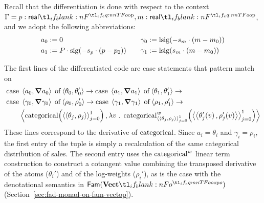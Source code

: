 \documentclass[11pt,a4paper]{article}
\theoremstyle{definition}
\theoremstyle{remark}
\providecommand{\Fam}[1]{\mathsf{Fam}(#1)}
\begin{document}
Recall that the differentiation is done with respect to the context \( \Gamma = p : \srcreal, m : \srcreal \), and we adopt the following abbreviations:
\begin{equation*}
  \begin{aligned}
    a_{0} &:= 0
    \\
    a_{1} &:= P \cdot \fn[n]{ \opn[b]{sig} }{ -s_{p} \cdot \left( p - p_{0} \right) }
  \end{aligned}
  \qquad
  \begin{aligned}
    \gamma_{0} &:= \fn[n]{ \opn[b]{lsig} }{ -s_{m} \cdot \left( m - m_{0} \right) }
    \\
    \gamma_{1} &:= \fn[n]{ \opn[b]{lsig} }{ s_{m} \cdot \left( m - m_{0} \right) }
  \end{aligned}
\end{equation*}

The first lines of the differentiated code are case statements that pattern match on
\begin{equation*}
  \begin{aligned}
    &\opn[b]{case} \; \tuple{ a_{0}, \grad a_{0} } \; \opn[b]{of}
      \tuple{ \theta_{0}, \theta_{0}' } \to
    \opn[b]{case} \; \tuple{ a_{1}, \grad a_{1} } \; \opn[b]{of}
      \tuple{ \theta_{1}, \theta_{1}' } \to
    \\
    &\opn[b]{case} \; \tuple{ \gamma_{0}, \grad \gamma_{0} } \; \opn[b]{of}
      \tuple{ \rho_{0}, \rho_{0}' } \to
    \opn[b]{case} \; \tuple{ \gamma_{1}, \grad \gamma_{1} } \; \opn[b]{of}
      \tuple{ \rho_{1}, \rho_{1}' } \to
    \\
    &\qquad
      \tuple{
      \fn[n]{ \opn[b]{categorical} }{
      \tuple{ \tuple{ \theta_{j}, \rho_{j} } }_{j = 0}^{1}
      },
      \lambda v \; . \;
      \fn[n]{
      \opn[b]{categorical}^{w}_{
      \tuple{ \tuple{ \theta_{j}, \rho_{j} } }_{j = 0}^{1}
      }
      }{
      \tuple{ \tuple{ \fn[n]{ \theta_{j}' }{ v }, \fn[n]{ \rho_{j}' }{ v } } }_{j = 0}^{1}
      }
      }
  \end{aligned}
\end{equation*}
These lines correspond to the derivative of \( \opn[b]{categorical} \). Since \( a_{i} = \theta_{i} \) and \( \gamma_{i} = \rho_{i} \), the first entry of the tuple is simply a recalculation of the same categorical distribution of sales. The second entry uses the \( \opn[b]{categorical}^{w} \) linear term construction to construct a cotangent value combining the transposed derivative of the atoms (\( \theta_{i}' \)) and of the log-weights (\( \rho_{i}' \)), as is the case with the denotational semantics in \( \Fam{\Vect[o]} \) (Section~\ref{sec:fad-monad-on-fam-vectop}).
\end{document}

